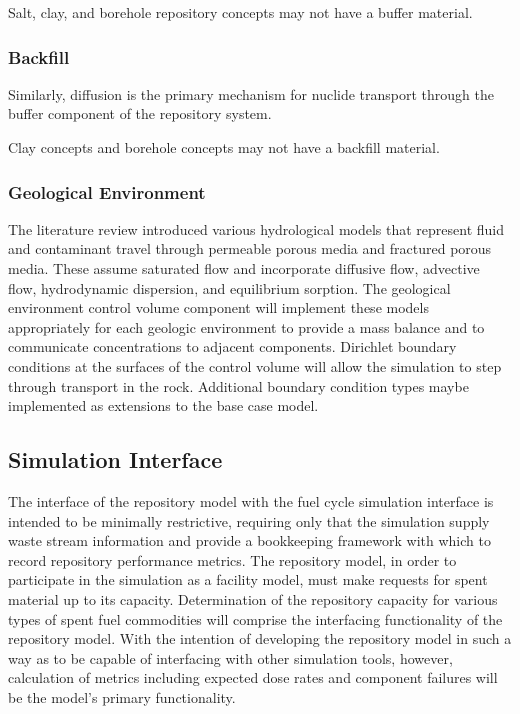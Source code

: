 Salt, clay, and borehole repository concepts may not have a buffer 
material.

\subsubsection{Backfill}
Similarly, diffusion is the primary mechanism for nuclide transport 
through the buffer component of the repository system.

Clay concepts and borehole concepts may not have a backfill material. 


\subsubsection{Geological Environment}

The literature review introduced various hydrological models that represent
fluid and contaminant travel through permeable porous media and fractured porous 
media. These assume saturated flow and incorporate diffusive flow, advective 
flow, hydrodynamic dispersion, and equilibrium sorption. The geological 
environment control volume component will implement these models appropriately 
for each geologic environment to provide a mass balance and to communicate concentrations to  
adjacent components.  Dirichlet boundary conditions at the surfaces of the 
control volume will allow the simulation to step through transport in the rock. 
Additional boundary condition types maybe implemented as extensions to the base 
case model.


\subsection{Simulation Interface}

The interface of the repository model with the \Cyclus fuel cycle 
simulation interface is intended to be minimally restrictive, 
requiring only that the simulation supply waste stream information and 
provide a bookkeeping framework with which to record repository 
performance metrics. The repository model, in order to participate in the 
simulation as a facility model, must make requests for spent material up 
to its capacity. Determination of the repository capacity for various 
types of spent fuel commodities will comprise the interfacing functionality of 
the repository model. With the intention of developing the repository model in 
such a way as to be capable of interfacing with other simulation tools, however, 
calculation of metrics including expected dose rates and 
component failures will be the model's primary functionality. 

